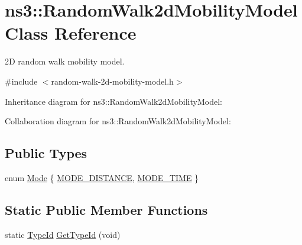 \hypertarget{classns3_1_1RandomWalk2dMobilityModel}{}\section{ns3\+:\+:Random\+Walk2d\+Mobility\+Model Class Reference}
\label{classns3_1_1RandomWalk2dMobilityModel}


2D random walk mobility model.  




{\ttfamily \#include $<$random-\/walk-\/2d-\/mobility-\/model.\+h$>$}



Inheritance diagram for ns3\+:\+:Random\+Walk2d\+Mobility\+Model\+:


Collaboration diagram for ns3\+:\+:Random\+Walk2d\+Mobility\+Model\+:
\subsection*{Public Types}
\begin{DoxyCompactItemize}
\item 
enum \hyperlink{classns3_1_1RandomWalk2dMobilityModel_a8b560f2a613c37d1bcd1c6204004801a}{Mode} \{ \hyperlink{classns3_1_1RandomWalk2dMobilityModel_a8b560f2a613c37d1bcd1c6204004801aad1b9605d05f240d1dc3e09f52c6c30f7}{M\+O\+D\+E\+\_\+\+D\+I\+S\+T\+A\+N\+CE}, 
\hyperlink{classns3_1_1RandomWalk2dMobilityModel_a8b560f2a613c37d1bcd1c6204004801aa7b52275f731d2355402ea5cc122247ce}{M\+O\+D\+E\+\_\+\+T\+I\+ME}
 \}
\end{DoxyCompactItemize}
\subsection*{Static Public Member Functions}
\begin{DoxyCompactItemize}
\item 
static \hyperlink{classns3_1_1TypeId}{Type\+Id} \hyperlink{classns3_1_1RandomWalk2dMobilityModel_a0f49061035f5d35202a72955f38c381c}{Get\+Type\+Id} (void)
\end{DoxyCompactItemize}

